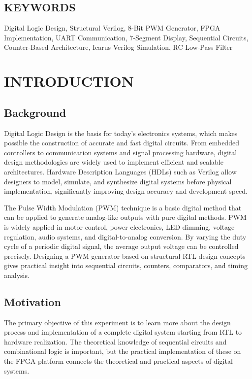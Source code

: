 \documentclass[12pt,a4paper]{article}
\begin{document}
\subsection*{KEYWORDS}
Digital Logic Design, Structural Verilog, 8-Bit PWM Generator, FPGA Implementation, UART Communication, 7-Segment Display, Sequential Circuits, Counter-Based Architecture, Icarus Verilog Simulation, RC Low-Pass Filter

\newpage

\tableofcontents
\newpage

\section{INTRODUCTION}

\subsection{Background}
Digital Logic Design is the basis for today's electronics systems, which makes possible the construction of accurate and fast digital circuits. From embedded controllers to communication systems and signal processing hardware, digital design methodologies are widely used to implement efficient and scalable architectures. Hardware Description Languages (HDLs) such as Verilog allow designers to model, simulate, and synthesize digital systems before physical implementation, significantly improving design accuracy and development speed.

The Pulse Width Modulation (PWM) technique is a basic digital method that can be applied to generate analog-like outputs with pure digital methods. PWM is widely applied in motor control, power electronics, LED dimming, voltage regulation, audio systems, and digital-to-analog conversion. By varying the duty cycle of a periodic digital signal, the average output voltage can be controlled precisely. Designing a PWM generator based on structural RTL design concepts gives practical insight into sequential circuits, counters, comparators, and timing analysis.

\subsection{Motivation}
The primary objective of this experiment is to learn more about the design process and implementation of a complete digital system starting from RTL to hardware realization. The theoretical knowledge of sequential circuits and combinational logic is important, but the practical implementation of these on the FPGA platform connects the theoretical and practical aspects of digital systems.
\end{document}
